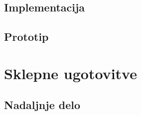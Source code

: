 \documentclass[a4paper, 12pt]{book}
\begin{document}
\section{Implementacija}

\section{Prototip}

\chapter{Sklepne ugotovitve}
\label{ch4}

\section{Nadaljnje delo}

\newpage %
\ \\
\clearpage
{}


\end{document}
